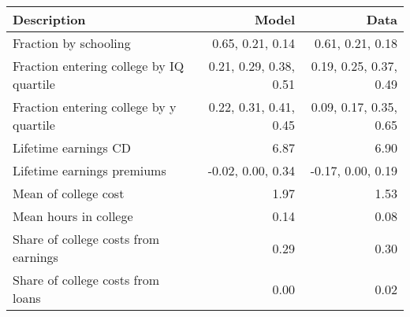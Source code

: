 \begin{tabular}{lrr}
\hline
Description & Model  & Data  \\ 
\hline
Fraction by schooling & 0.65, 0.21, 0.14  & 0.61, 0.21, 0.18  \\ 
Fraction entering college by IQ quartile & 0.21, 0.29, 0.38, 0.51  & 0.19, 0.25, 0.37, 0.49  \\ 
Fraction entering college by y quartile & 0.22, 0.31, 0.41, 0.45  & 0.09, 0.17, 0.35, 0.65  \\ 
Lifetime earnings CD & 6.87  & 6.90  \\ 
Lifetime earnings premiums & -0.02, 0.00, 0.34  & -0.17, 0.00, 0.19  \\ 
Mean of college cost & 1.97  & 1.53  \\ 
Mean hours in college & 0.14  & 0.08  \\ 
Share of college costs from earnings & 0.29  & 0.30  \\ 
Share of college costs from loans & 0.00  & 0.02  \\ 
\hline
\end{tabular}%
